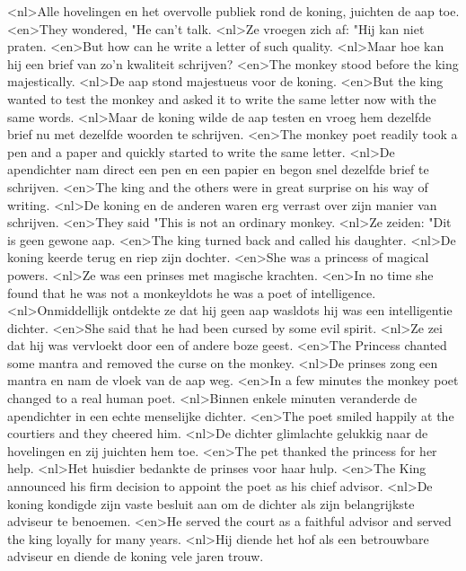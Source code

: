 <nl>Alle hovelingen en het overvolle publiek rond de koning, juichten de aap toe.
<en>They wondered, "He can't talk.
<nl>Ze vroegen zich af: "Hij kan niet praten.
<en>But how can he write a letter of such quality.
<nl>Maar hoe kan hij een brief van zo'n kwaliteit schrijven?
<en>The monkey stood before the king majestically.
<nl>De aap stond majestueus voor de koning.
<en>But the king wanted to test the monkey and asked it to write the same letter now with the same words.
<nl>Maar de koning wilde de aap testen en vroeg hem dezelfde brief nu met dezelfde woorden te schrijven.
<en>The monkey poet readily took a pen and a paper and  quickly started to write the same letter.
<nl>De apendichter nam direct een pen en een papier en begon snel dezelfde brief te schrijven.
<en>The king and the others were in great surprise on his way of writing.
<nl>De koning en de anderen waren erg verrast over zijn manier van schrijven.
<en>They said "This is not an ordinary monkey.
<nl>Ze zeiden: "Dit is geen gewone aap.
<en>The king turned back and called his daughter.
<nl>De koning keerde terug en riep zijn dochter.
<en>She was a princess of magical powers.
<nl>Ze was een prinses met magische krachten.
<en>In no time she found that he was not a monkeyldots he was a poet of intelligence.
<nl>Onmiddellijk ontdekte ze dat hij geen aap wasldots hij was een intelligentie dichter.
<en>She said that he had been cursed by some evil spirit.
<nl>Ze zei dat hij was vervloekt door een of andere boze geest.
<en>The Princess chanted some mantra and removed the curse on the monkey.
<nl>De prinses zong een mantra en nam de vloek van de aap weg.
<en>In a few minutes the monkey poet changed to a real human poet.
<nl>Binnen enkele minuten veranderde de apendichter in een echte menselijke dichter.
<en>The poet smiled happily at the courtiers and they cheered him.
<nl>De dichter glimlachte gelukkig naar de hovelingen en zij juichten hem toe.
<en>The pet thanked the princess for her help.
<nl>Het huisdier bedankte de prinses voor haar hulp.
<en>The King announced his firm decision to appoint the poet as his chief advisor.
<nl>De koning kondigde zijn vaste besluit aan om de dichter als zijn belangrijkste adviseur te benoemen.
<en>He served the court as a faithful advisor and served the king loyally for many years.
<nl>Hij diende het hof als een betrouwbare adviseur en diende de koning vele jaren trouw.
